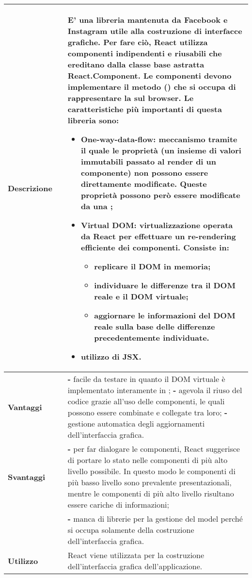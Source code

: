 \begin{table}[H]
	\centering
	\begin{tabular}{p{2cm}p{0.5cm}p{11.5cm}}
		\arrayrulecolor{lightgray}
		\toprule
		\textbf{Descrizione} & &
		E' una libreria \js{} \glo{Open source}{open source} mantenuta da Facebook e Instagram utile alla costruzione di interfacce grafiche. Per fare ciò, React utilizza componenti indipendenti e riusabili che ereditano dalla classe base astratta React.Component. Le componenti devono implementare il metodo \glo{Render}{render}() che si occupa di rappresentare la \glo{Componente}{componente} sul browser.
		Le caratteristiche più importanti di questa libreria sono:
		\begin{itemize}
			\item {\textbf{One-way-data-flow:}} meccanismo tramite il quale le proprietà (un insieme di valori immutabili passato al render di un componente) non possono essere direttamente modificate. Queste proprietà possono però essere modificate da una \glo{Callback}{callback};
			\item {\textbf{Virtual DOM:}} virtualizzazione operata da React per effettuare un re-rendering efficiente dei componenti. 
			Consiste in:
			\begin{itemize}
				\item replicare il DOM in memoria;
				\item individuare le differenze tra il DOM reale e il DOM virtuale;
				\item aggiornare le informazioni del DOM reale sulla base delle differenze precedentemente individuate.
			\end{itemize}
			\item utilizzo di JSX.
		\end{itemize}
		\\ \midrule \textbf{Vantaggi} & &
		\textbf{- }facile da testare in quanto il DOM virtuale è implementato interamente in \js;
		\newline
		\textbf{- }agevola il riuso del codice grazie all'uso delle componenti, le quali possono essere combinate e collegate tra loro;
		\newline
		\textbf{- } gestione automatica degli aggiornamenti dell'interfaccia grafica.
		\\ \midrule \textbf{Svantaggi} & &
		\textbf{- } per far dialogare le componenti, React suggerisce di portare lo stato nelle componenti di più alto livello possibile. In questo modo le componenti di più basso livello sono prevalente presentazionali, mentre le componenti di più alto livello risultano essere cariche di informazioni;\\ &&
		\textbf{- } manca di librerie per la gestione del model perché si occupa solamente della costruzione dell'interfaccia grafica.
		\\ \midrule
		\textbf{Utilizzo} & &
		React viene utilizzata per la costruzione dell'interfaccia grafica dell'applicazione.
		\\ \bottomrule
	\end{tabular}
\end{table}

